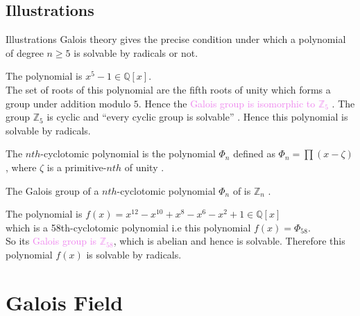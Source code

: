 \documentclass{beamer}
\begin{document}
\subsection{Illustrations}
\begin{frame}[allowframebreaks]{Illustrations}
  Galois theory gives the precise condition under which a polynomial of degree \(n \geq 5\) is solvable by radicals or not.

  \vspace{7mm}
   \begin{tcolorbox}[colback=white, colframe=brown!80!black, boxsep=3mm, title={\bfseries \color{white} Example}]
  The polynomial is \(x^5-1 \in \mathbb{Q}[x]\).\\
  The set of  roots of this polynomial are the fifth roots of unity which forms a group under addition modulo \(5\). Hence the \textcolor{violet}{Galois group is isomorphic to \(\mathbb{Z}_5\)} \cite{hunger}. The group \(\mathbb{Z}_5\) is cyclic and ``every cyclic group is solvable'' \cite{galois}. Hence this polynomial is solvable by radicals.
\end{tcolorbox}

\framebreak
\begin{definition}
 The \(nth\)-cyclotomic polynomial is the polynomial \({\Phi}_n\) defined as \({\Phi}_n= \prod {(x-\zeta)}\), where \(\zeta\) is a primitive-\(nth\) of unity \cite{galois}.
\end{definition}

\begin{theorem}[Theorem]
  The Galois group of a \(nth\)-cyclotomic polynomial \({\Phi}_n\) of is \(\mathbb{Z}_n\) \cite{galois}.
\end{theorem}

\vspace{5mm}
 \begin{tcolorbox}[colback=white, colframe=brown!80!black, boxsep=1mm, title={\bfseries \color{white} Example}]
The polynomial is \(f(x)=x^{12}-x^{10}+x^8-x^6-x^2+1 \in \mathbb{Q}[x]\) \cite{galois}\\
which is a 58th-cyclotomic polynomial i.e this polynomial \(f(x)={\Phi}_{58}\).\\
So its \textcolor{violet}{Galois group is \(\mathbb{Z}_{58}\)}, which is abelian and hence is solvable. Therefore this polynomial \(f(x)\) is solvable by radicals.
\end{tcolorbox}
\end{frame}

\section{Galois Field}
\end{document}
